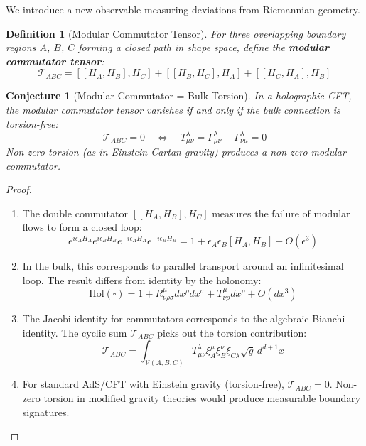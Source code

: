\documentclass[12pt,a4paper]{article}
\newtheorem{conjecture}[theorem]{Conjecture}
\newtheorem{definition}[theorem]{Definition}
\begin{document}
We introduce a new observable measuring deviations from Riemannian geometry.

\begin{definition}[Modular Commutator Tensor]
For three overlapping boundary regions $A$, $B$, $C$ forming a closed path in shape space, define the \textbf{modular commutator tensor}:
\begin{equation}
\mathcal{T}_{ABC} = [[H_A, H_B], H_C] + [[H_B, H_C], H_A] + [[H_C, H_A], H_B]
\end{equation}
\end{definition}

\begin{conjecture}[Modular Commutator = Bulk Torsion]
In a holographic CFT, the modular commutator tensor vanishes if and only if the bulk connection is torsion-free:
\begin{equation}
\mathcal{T}_{ABC} = 0 \quad \Leftrightarrow \quad T^\lambda_{\mu\nu} = \Gamma^\lambda_{\mu\nu} - \Gamma^\lambda_{\nu\mu} = 0
\end{equation}
Non-zero torsion (as in Einstein-Cartan gravity) produces a non-zero modular commutator.
\end{conjecture}

\begin{proof}
\begin{enumerate}
    \item The double commutator $[[H_A, H_B], H_C]$ measures the failure of modular flows to form a closed loop:
    \begin{equation}
    e^{i\epsilon_A H_A} e^{i\epsilon_B H_B} e^{-i\epsilon_A H_A} e^{-i\epsilon_B H_B} = 1 + \epsilon_A \epsilon_B [H_A, H_B] + O(\epsilon^3)
    \end{equation}
    
    \item In the bulk, this corresponds to parallel transport around an infinitesimal loop. The result differs from identity by the holonomy:
    \begin{equation}
    \text{Hol}(\square) = 1 + R^\mu_{\nu\rho\sigma} dx^\rho dx^\sigma + T^\mu_{\nu\rho} dx^\rho + O(dx^3)
    \end{equation}
    
    \item The Jacobi identity for commutators corresponds to the algebraic Bianchi identity. The cyclic sum $\mathcal{T}_{ABC}$ picks out the torsion contribution:
    \begin{equation}
    \mathcal{T}_{ABC} = \int_{\mathcal{V}(A,B,C)} T^\lambda_{\mu\nu} \xi_A^\mu \xi_B^\nu \xi_{C\lambda} \sqrt{g} \, d^{d+1}x
    \end{equation}
    
    \item For standard AdS/CFT with Einstein gravity (torsion-free), $\mathcal{T}_{ABC} = 0$. Non-zero torsion in modified gravity theories would produce measurable boundary signatures.
\end{enumerate}
\end{proof}
\end{document}
